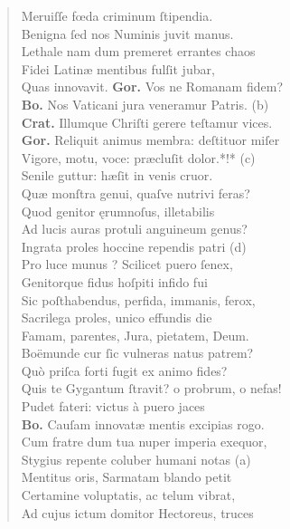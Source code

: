 \documentclass[a4paper,12pt]{article}
\begin{document}
\begin{verse}
Meruiſſe fœda criminum ſtipendia.\\[0pt]
Benigna ſed nos Numinis juvit manus.\\[0pt]
Lethale nam dum premeret errantes chaos\\[0pt]
Fidei Latinæ mentibus fulſit jubar,\\[0pt]
Quas innovavit. \textbf{Gor.} Vos ne Romanam fidem?\\[0pt]
\textbf{Bo.} Nos Vaticani jura veneramur Patris. (b)\footnotemark\\[0pt]
\textbf{Crat.} Illumque Chriſti gerere teſtamur vices.\\[0pt]
\textbf{Gor.} Reliquit animus membra: deſtituor miſer\\[0pt]
Vigore, motu, voce: præcluſit dolor.*!* (c)\footnotemark\\[0pt]
Senile guttur: hæſit in venis cruor.\\[0pt]
Quæ monſtra genui, quaſve nutrivi feras?\\[0pt]
Quod genitor ęrumnoſus, illetabilis\\[0pt]
Ad lucis auras protuli anguineum genus?\\[0pt]
Ingrata proles hoccine rependis patri (d)\footnotemark\\[0pt]
Pro luce munus ? Scilicet puero ſenex,\\[0pt]
Genitorque fidus hoſpiti infido fui\\[0pt]
Sic poſthabendus, perfida, immanis, ferox,\\[0pt]
Sacrilega proles, unico effundis die\\[0pt]
Famam, parentes, Jura, pietatem, Deum.\\[0pt]
Boëmunde cur ſic vulneras natus patrem?\\[0pt]
Quò priſca forti fugit ex animo fides?\\[0pt]
Quis te Gygantum ſtravit? o probrum, o nefas!\\[0pt]
Pudet fateri: victus à puero jaces\\[0pt]
\textbf{Bo.} Cauſam innovatæ mentis excipias rogo.\\[0pt]
Cum fratre dum tua nuper imperia exequor,\\[0pt]
Stygius repente coluber humani notas (a)\footnotemark\\[0pt]
Mentitus oris, Sarmatam blando petit\\[0pt]
Certamine voluptatis, ac telum vibrat,\\[0pt]
Ad cujus ictum domitor Hectoreus, truces\\[0pt]

\end{verse}
\end{document}
